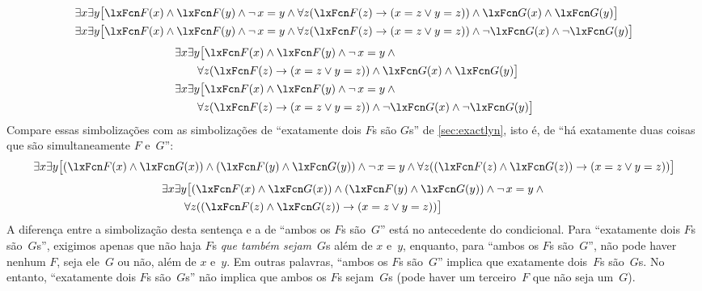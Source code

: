 \ifHTMLtarget
\begin{align*}
	& \exists x\exists y\bigl[\atom{F}{x} \eand \atom{F}{y} \eand \enot\, {x=y} \eand
	\forall z(\atom{F}{z} \eif (x = z \lor y = z)) \eand \atom{G}{x} \eand \atom{G}{y}\bigr]\\
	& \exists x\exists y\bigl[\atom{F}{x} \eand \atom{F}{y} \eand \enot\, {x=y} \eand
	\forall z(\atom{F}{z} \eif (x = z \lor y = z)) \eand \enot \atom{G}{x} \eand \enot \atom{G}{y}\bigr]
\end{align*}
\else
\begin{align*}
	& \exists x\exists y\bigl[\atom{F}{x} \eand \atom{F}{y} \eand \enot\, {x=y} \eand {}\\
	& \qquad \forall z(\atom{F}{z} \eif (x = z \lor y = z)) \eand \atom{G}{x} \eand \atom{G}{y}\bigr]\\
	& \exists x\exists y\bigl[\atom{F}{x} \eand \atom{F}{y} \eand \enot\, {x=y} \eand  {}\\
	& \qquad\forall z(\atom{F}{z} \eif (x = z \lor y = z)) \eand \enot \atom{G}{x} \eand \enot \atom{G}{y}\bigr]
\end{align*}
\fi
Compare essas simbolizações com as simbolizações de \textquotedblleft exatamente dois $F$s são $G$s\textquotedblright{} de \cref{sec:exactlyn}, isto é, de \textquotedblleft há exatamente duas coisas que são simultaneamente $F$ e~$G$\textquotedblright{}:
\ifHTMLtarget
	\[
		\exists x\exists y\bigl[(\atom{F}{x} \eand \atom{G}{x}) \eand (\atom{F}{y} \eand \atom{G}{y}) \eand \enot\, {x=y} \eand
		\forall z((\atom{F}{z} \eand \atom{G}{z}) \eif (x = z \lor y = z))\bigr]
	\]
\else
\begin{align*}
	& \exists x\exists y\bigl[(\atom{F}{x} \eand \atom{G}{x}) \eand (\atom{F}{y} \eand \atom{G}{y}) \eand \enot\, {x=y} \eand {}\\
	& \qquad\forall z((\atom{F}{z} \eand \atom{G}{z}) \eif (x = z \lor y = z))\bigr]
\end{align*}
\fi
A diferença entre a simbolização desta sentença e a de \textquotedblleft ambos os $F$s são~$G$\textquotedblright{} está no antecedente do condicional. Para \textquotedblleft exatamente dois $F$s são~$G$s\textquotedblright{}, exigimos apenas que não haja $F$s \emph{que também sejam}~$G$s além de $x$ e~$y$, enquanto, para \textquotedblleft ambos os $F$s são~$G$\textquotedblright{}, não pode haver nenhum $F$, seja ele~$G$ ou não, além de $x$ e~$y$. Em outras palavras, \textquotedblleft ambos os $F$s são~$G$\textquotedblright{} implica que exatamente dois~$F$s são~$G$s. No entanto, \textquotedblleft exatamente dois $F$s são~$G$s\textquotedblright{} não implica que ambos os $F$s sejam~$G$s (pode haver um terceiro~$F$ que não seja um~$G$).

